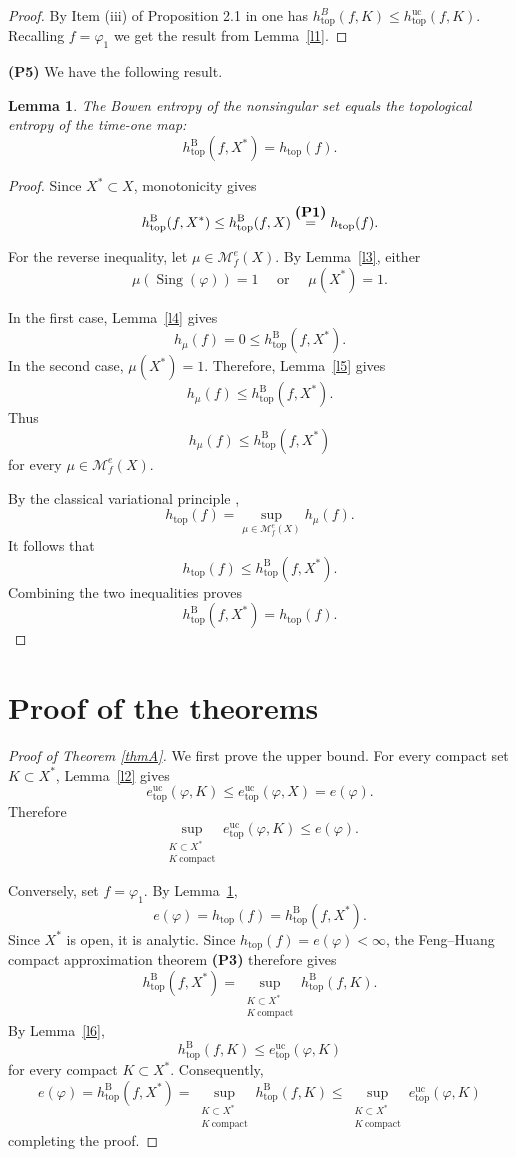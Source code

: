 \documentclass[11pt,reqno]{amsart}
\newtheorem{lemma}[theorem]{Lemma}
\theoremstyle{definition}
\theoremstyle{remark}
\newcommand{\cM}{\mathcal{M}}
\newcommand{\Sing}{\operatorname{Sing}}
\newcommand{\htop}{h_{\mathrm{top}}}
\newcommand{\huc}{h^{\mathrm{uc}}_{\mathrm{top}}}
\newcommand{\hB}{h^{\mathrm{B}}_{\mathrm{top}}}
\newcommand{\hE}{e^{\mathrm{uc}}_{\mathrm{top}}}
\begin{document}
\begin{proof}
By Item (iii) of Proposition 2.1 in \cite{fh} one has $h^B_{\mathrm{top}}(f,K)\leq \huc(f,K)$.
Recalling $f=\varphi_1$ we get the result from Lemma~\ref{l1}.
\end{proof}

\noindent
{\bf (P5)}
We have the following result.


\begin{lemma}
\label{l7}
The Bowen entropy of the nonsingular set equals the topological entropy
of the time-one map:
\[
\hB(f,X^*)=\htop(f).
\]
\end{lemma}

\begin{proof}
Since $X^*\subset X$, monotonicity gives
\[
\hB(f,X^*)\leq\hB(f,X)\overset{\mbox{\bf (P1)}}{=}\htop(f).
\]

For the reverse inequality, let $\mu\in\cM_f^e(X)$. By
Lemma~\ref{l3}, either
\[
\mu(\Sing(\varphi))=1
\quad\mbox{ or }\quad
\mu(X^*)=1.
\]

In the first case, Lemma~\ref{l4} gives
\[
h_\mu(f)=0\leq\hB(f,X^*).
\]
In the second case, $\mu(X^*)=1$. Therefore,
Lemma~\ref{l5} gives
\[
h_\mu(f)\leq\hB(f,X^*).
\]
Thus
\[
h_\mu(f)\leq\hB(f,X^*)
\]
for every $\mu\in\cM_f^e(X)$.

By the classical variational principle \cite{w},
\[
\htop(f)
=
\sup_{\mu\in\cM_f^e(X)}h_\mu(f).
\]
It follows that
\[
\htop(f)\leq\hB(f,X^*).
\]
Combining the two inequalities proves
\[
\hB(f,X^*)=\htop(f).
\]
\end{proof}

\section{Proof of the theorems}
\label{sec5}







\begin{proof}[Proof of Theorem \ref{thmA}]
We first prove the upper bound. For every compact set $K\subset X^*$,
Lemma~\ref{l2} gives
\[
\hE(\varphi,K)
\leq
\hE(\varphi,X)
=
e(\varphi).
\]
Therefore
\[
\sup_{\substack{K\subset X^*\\K\ \mathrm{compact}}}
\hE(\varphi,K)
\leq
e(\varphi).
\]

Conversely, 
set $f=\varphi_1$. By Lemma~\ref{l7},
\[
e(\varphi)=\htop(f)=\hB(f,X^*).
\]
Since $X^*$ is open, it is analytic. Since $\htop(f)=e(\varphi)<\infty$, the Feng--Huang compact
approximation theorem {\bf (P3)} therefore gives
\[
\hB(f,X^*)
=
\sup_{\substack{K\subset X^*\\K\ \mathrm{compact}}}
\hB(f,K).
\]
By Lemma~\ref{l6},
\[
\hB(f,K)\leq\hE(\varphi,K)
\]
for every compact $K\subset X^*$. Consequently,
\[
e(\varphi)=\hB(f,X^*)=
\sup_{\substack{K\subset X^*\\K\ \mathrm{compact}}}
\hB(f,K)\leq
\sup_{\substack{K\subset X^*\\K\ \mathrm{compact}}}
\hE(\varphi,K)
\]
completing the proof.
\end{proof}
\end{document}
